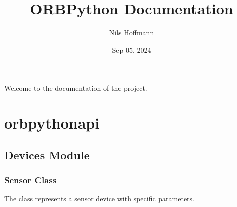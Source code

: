 \documentclass[letterpaper,10pt,english]{sphinxmanual}
\title{ORB\sphinxhyphen{}Python Documentation}
\date{Sep 05, 2024}
\author{Nils Hoffmann}
\begin{document}
\sphinxmaketitle


\sphinxAtStartPar
Welcome to the documentation of the  project.


\chapter{orb\sphinxhyphen{}python\sphinxhyphen{}api}
\label{\detokenize{orb-python-api:orb-python-api}}\label{\detokenize{orb-python-api::doc}}
\sphinxstepscope


\section{Devices Module}
\label{\detokenize{devices:devices-module}}\label{\detokenize{devices::doc}}
\sphinxstepscope


\subsection{Sensor Class}
\label{\detokenize{sensor:sensor-class}}\label{\detokenize{sensor::doc}}
\sphinxAtStartPar
The  class represents a sensor device with specific parameters.
\end{document}

